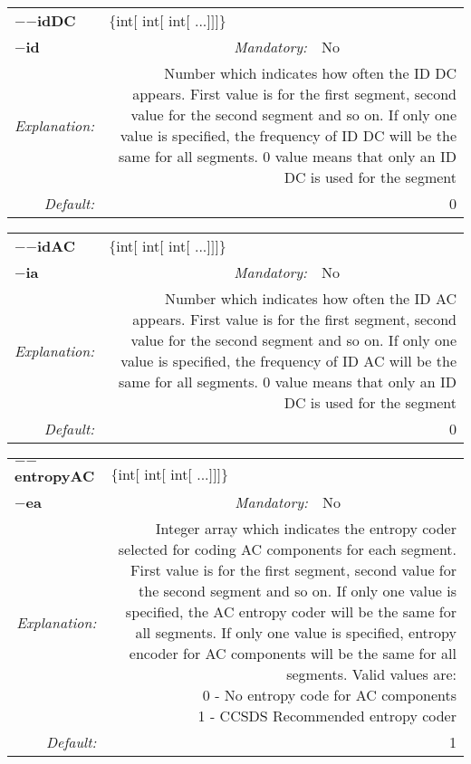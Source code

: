 \begin{center}\begin{tabular}{|rr|rlrl|}
\hline
\multicolumn{2}{|l|}{\textbf{$-$$-$idDC}} & \multicolumn{4}{|l|}{$\{$int$[$ int$[$ int$[$ ...$]$$]$$]$$\}$} \\
\cline{3-6}
\multicolumn{2}{|l|}{\textbf{$-$id}} & \emph{Mandatory:} & No & &  \\
\hline
\emph{Explanation:} & \multicolumn{5}{|p{12cm}|}{Number which indicates how often the ID DC appears. First value is for the first segment, second value for the second segment and so on. If only one value is specified, the frequency of ID DC will be the same for all segments. 0 value means that only an ID DC is used for the segment} \\
\hline
\emph{Default:} & \multicolumn{5}{|p{12cm}|}{0 } \\
\hline
\end{tabular}\end{center}
\begin{center}\begin{tabular}{|rr|rlrl|}
\hline
\multicolumn{2}{|l|}{\textbf{$-$$-$idAC}} & \multicolumn{4}{|l|}{$\{$int$[$ int$[$ int$[$ ...$]$$]$$]$$\}$} \\
\cline{3-6}
\multicolumn{2}{|l|}{\textbf{$-$ia}} & \emph{Mandatory:} & No & &  \\
\hline
\emph{Explanation:} & \multicolumn{5}{|p{12cm}|}{Number which indicates how often the ID AC appears. First value is for the first segment, second value for the second segment and so on. If only one value is specified, the frequency of ID AC will be the same for all segments. 0 value means that only an ID DC is used for the segment} \\
\hline
\emph{Default:} & \multicolumn{5}{|p{12cm}|}{0 } \\
\hline
\end{tabular}\end{center}
\begin{center}\begin{tabular}{|rr|rlrl|}
\hline
\multicolumn{2}{|l|}{\textbf{$-$$-$entropyAC}} & \multicolumn{4}{|l|}{$\{$int$[$ int$[$ int$[$ ...$]$$]$$]$$\}$} \\
\cline{3-6}
\multicolumn{2}{|l|}{\textbf{$-$ea}} & \emph{Mandatory:} & No & &  \\
\hline
\emph{Explanation:} & \multicolumn{5}{|p{12cm}|}{Integer array which indicates the entropy coder selected for coding AC components for each segment. First value is for the first segment, second value for the second segment and so on. If only one value is specified, the AC entropy coder will be the same for all segments. If only one value is specified, entropy encoder for AC components will be the same for all segments. Valid values are:\newline 0 -  No entropy code for AC components \newline 1 - CCSDS Recommended  entropy coder\newline } \\
\hline
\emph{Default:} & \multicolumn{5}{|p{12cm}|}{1 } \\
\hline
\end{tabular}\end{center}
